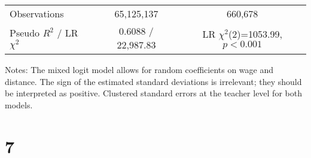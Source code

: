 \documentclass{article}
\begin{document}
\begin{table}[H]
\begin{threeparttable}
\begin{tabular}{lcccccc}
Observations       & \multicolumn{3}{c}{65,125,137} & \multicolumn{3}{c}{660,678} \\
Pseudo $R^2$ / LR $\chi^2$ & \multicolumn{3}{c}{0.6088 / 22,987.83} & \multicolumn{3}{c}{LR $\chi^2$(2)=1053.99, $p<0.001$} \\
\bottomrule
\end{tabular}
\begin{tablenotes}
\footnotesize
\item Notes: The mixed logit model allows for random coefficients on wage and distance. 
The sign of the estimated standard deviations is irrelevant; they should be interpreted as positive.
Clustered standard errors at the teacher level for both models.
\end{tablenotes}
\end{threeparttable}
\end{table}

\section{7}
\end{document}
